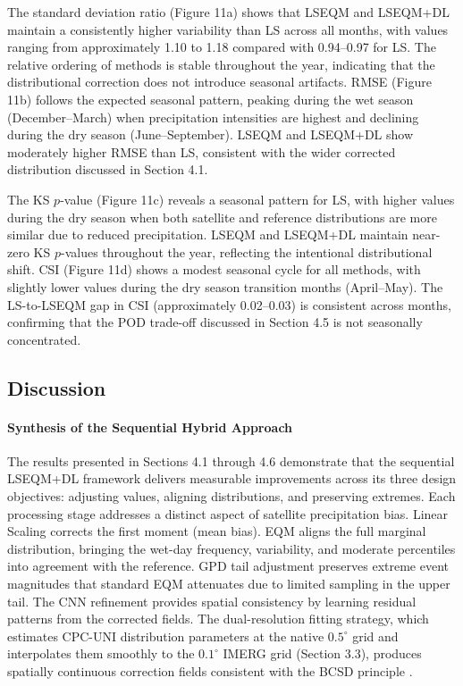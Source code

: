 \documentclass[11pt,a4paper]{article}
\begin{document}
The standard deviation ratio (Figure 11a) shows that LSEQM and LSEQM+DL
maintain a consistently higher variability than LS across all months,
with values ranging from approximately 1.10 to 1.18 compared with
0.94--0.97 for LS. The relative ordering of methods is stable throughout
the year, indicating that the distributional correction does not
introduce seasonal artifacts. RMSE (Figure 11b) follows the expected
seasonal pattern, peaking during the wet season (December--March) when
precipitation intensities are highest and declining during the dry
season (June--September). LSEQM and LSEQM+DL show moderately higher RMSE
than LS, consistent with the wider corrected distribution discussed in
Section 4.1.

The KS \(p\)-value (Figure 11c) reveals a seasonal pattern for LS, with
higher values during the dry season when both satellite and reference
distributions are more similar due to reduced precipitation. LSEQM and
LSEQM+DL maintain near-zero KS \(p\)-values throughout the year,
reflecting the intentional distributional shift. CSI (Figure 11d) shows
a modest seasonal cycle for all methods, with slightly lower values
during the dry season transition months (April--May). The LS-to-LSEQM
gap in CSI (approximately 0.02--0.03) is consistent across months,
confirming that the POD trade-off discussed in Section 4.5 is not
seasonally concentrated.

\subsection{Discussion}\label{discussion}

\paragraph{Synthesis of the Sequential Hybrid
Approach}

The results presented in Sections 4.1 through 4.6 demonstrate that the
sequential LSEQM+DL framework delivers measurable improvements across
its three design objectives: adjusting values, aligning distributions,
and preserving extremes. Each processing stage addresses a distinct
aspect of satellite precipitation bias. Linear Scaling corrects the
first moment (mean bias). EQM aligns the full marginal distribution,
bringing the wet-day frequency, variability, and moderate percentiles
into agreement with the reference. GPD tail adjustment preserves extreme
event magnitudes that standard EQM attenuates due to limited sampling in
the upper tail. The CNN refinement provides spatial consistency by
learning residual patterns from the corrected fields. The
dual-resolution fitting strategy, which estimates CPC-UNI distribution
parameters at the native \(0.5^{\circ}\) grid and interpolates them
smoothly to the \(0.1^{\circ}\) IMERG grid (Section 3.3), produces
spatially continuous correction fields consistent with the BCSD
principle \cite{ref23}.
\end{document}
